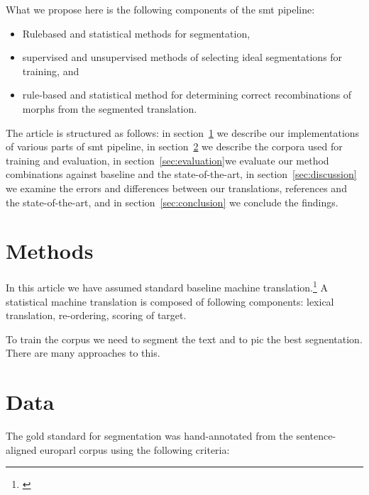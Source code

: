 \documentclass[11pt,letterpaper]{article}
\begin{document}
What we propose here is the following components of the smt pipeline:

\begin{itemize}
    \item Rulebased and statistical methods for segmentation,
    \item supervised and unsupervised methods of selecting ideal segmentations
        for training, and
    \item rule-based and statistical method for determining correct
        recombinations of morphs from the segmented translation.
\end{itemize}

The article is structured as follows: in section~\ref{sec:methods} we describe
our implementations of various parts of smt pipeline, in section~\ref{sec:data}
we describe the corpora used for training and evaluation, in
section~\ref{sec:evaluation}we evaluate our method combinations against
baseline and the state-of-the-art, in section~\ref{sec:discussion} we examine
the errors and differences between our translations, references and the
state-of-the-art, and in section~\ref{sec:conclusion} we conclude the
findings.

\section{Methods}
\label{sec:methods}

In this article we have assumed standard baseline machine 
translation.\footnote{\url{}} 
A statistical machine translation is composed of following components:
lexical translation, re-ordering, scoring of target. 

To train the corpus we need to segment the text and to pic the best
segnentation. There are many approaches to this. 



\section{Data}
\label{sec:data}

The gold standard for segmentation was hand-annotated from the sentence-aligned
europarl corpus using the following criteria:
\end{document}
